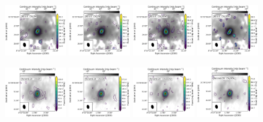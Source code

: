 \documentclass[twocolumn]{aastex62}
\begin{document}
\begin{figure}[htbp!]
  \includegraphics[width=0.24\textwidth]{Set3_ID00_CH3OH_243915.pdf}
  \includegraphics[width=0.24\textwidth]{Set3_ID00_CH3CN_257527.pdf}
  \includegraphics[width=0.24\textwidth]{Set3_ID00_CH3OCHO_259342.pdf}
  \includegraphics[width=0.24\textwidth]{Set3_ID00_CH3OCH3_259311.pdf}

  \includegraphics[width=0.24\textwidth]{Set3_ID01_CH3OH_243915.pdf}
  \includegraphics[width=0.24\textwidth]{Set3_ID01_CH3CN_257527.pdf}
  \includegraphics[width=0.24\textwidth]{Set3_ID01_CH3OCHO_259342.pdf}
  \includegraphics[width=0.24\textwidth]{Set3_ID01_CH3OCH3_259311.pdf}


\end{figure}
\end{document}

